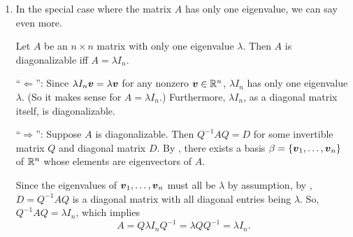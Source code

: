 \begin{enumerate}
\item \label{it:one-eigenval-identity} In the special case where the matrix
\(A\) has only one eigenvalue, we can say even more.

Let \(A\) be an \(n\times n\) matrix with only one eigenvalue \(\lambda\). Then
\(A\) is diagonalizable iff \(A=\lambda I_n\).

\begin{pf}
``\(\Leftarrow\)'': Since \(\lambda I_n\vb*{v}=\lambda\vb*{v}\) for any
nonzero \(\vb*{v}\in\mathbb{R}^n\), \(\lambda I_n\) has only one eigenvalue
\(\lambda\). (So it makes sense for \(A=\lambda I_n\).) Furthermore, \(\lambda
I_n\), as a diagonal matrix itself, is diagonalizable.

``\(\Rightarrow\)'': Suppose \(A\) is diagonalizable. Then \(Q^{-1}AQ=D\) for
some invertible matrix \(Q\) and diagonal matrix \(D\). By
, there exists a basis
\(\beta=\{\vb*{v}_1,\dotsc,\vb*{v}_n\}\) of \(\mathbb{R}^n\) whose elements are
eigenvectors of \(A\).

Since the eigenvalues of \(\vb*{v}_1,\dotsc,\vb*{v}_n\) must all be
\(\lambda\) by assumption, by , \(D=Q^{-1}AQ\) is a
diagonal matrix with all diagonal entries being \(\lambda\). So,
\(Q^{-1}AQ=\lambda I_n\), which implies
\[
A=Q\lambda I_nQ^{-1}
=\lambda QQ^{-1}
=\lambda I_n.
\]
\end{pf}
\end{enumerate}
